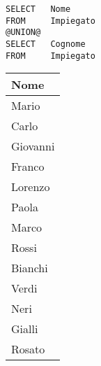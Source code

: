 \begin{lstlisting}
SELECT   Nome
FROM     Impiegato
@UNION@
SELECT   Cognome
FROM     Impiegato
\end{lstlisting}


\begin{table}[H]
	\centering
	\begin{tabular}{@{} l @{}}
		\toprule
			Nome \\
		\midrule
			Mario \\
			Carlo \\
			Giovanni \\
			Franco \\
			Lorenzo \\
			Paola \\
			Marco \\
		\midrule
			Rossi \\
			Bianchi \\
			Verdi \\
			Neri \\
			Gialli \\
			Rosato \\
		\bottomrule
	\end{tabular}
\end{table}
